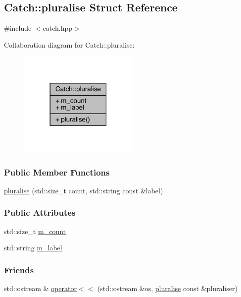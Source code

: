 \hypertarget{a00064}{}\subsection{Catch\+:\+:pluralise Struct Reference}
\label{a00064}


{\ttfamily \#include $<$catch.\+hpp$>$}



Collaboration diagram for Catch\+:\+:pluralise\+:\nopagebreak
\begin{figure}[H]
\begin{center}
\leavevmode
\includegraphics[width=165pt]{a00245}
\end{center}
\end{figure}
\subsubsection*{Public Member Functions}
\begin{DoxyCompactItemize}
\item 
\hyperlink{a00064_a5c55e22de2416cfe416edf715c6b9234}{pluralise} (std\+::size\+\_\+t count, std\+::string const \&label)
\end{DoxyCompactItemize}
\subsubsection*{Public Attributes}
\begin{DoxyCompactItemize}
\item 
std\+::size\+\_\+t \hyperlink{a00064_a4dce2fa13ec6f00fac09b2418265441e}{m\+\_\+count}
\item 
std\+::string \hyperlink{a00064_a8849cbdd3f11ebe7747597c8644e8793}{m\+\_\+label}
\end{DoxyCompactItemize}
\subsubsection*{Friends}
\begin{DoxyCompactItemize}
\item 
std\+::ostream \& \hyperlink{a00064_aa7dac6b165514c1f85e0695d678fdef5}{operator$<$$<$} (std\+::ostream \&os, \hyperlink{a00064}{pluralise} const \&pluraliser)
\end{DoxyCompactItemize}


